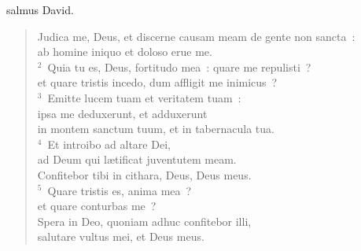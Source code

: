 \bchapter
{}salmus David. \begin{flushleft}\begin{verse}\vspace{6pt}Judica me, Deus, et discerne causam meam de gente non sancta~:\\ ab homine iniquo et doloso erue me.\\
${}^{2}$~Quia tu es, Deus, fortitudo mea~: quare me repulisti~?\\ et quare tristis incedo, dum affligit me inimicus~?\\
${}^{3}$~Emitte lucem tuam et veritatem tuam~:\\ ipsa me deduxerunt, et adduxerunt\\ in montem sanctum tuum, et in tabernacula tua.\\
${}^{4}$~Et introibo ad altare Dei,\\ ad Deum qui l\ae tificat juventutem meam.\\ Confitebor tibi in cithara, Deus, Deus meus.\\
${}^{5}$~Quare tristis es, anima mea~?\\ et quare conturbas me~?\\ Spera in Deo, quoniam adhuc confitebor illi,\\ salutare vultus mei, et Deus meus.\end{verse}\end{flushleft}



